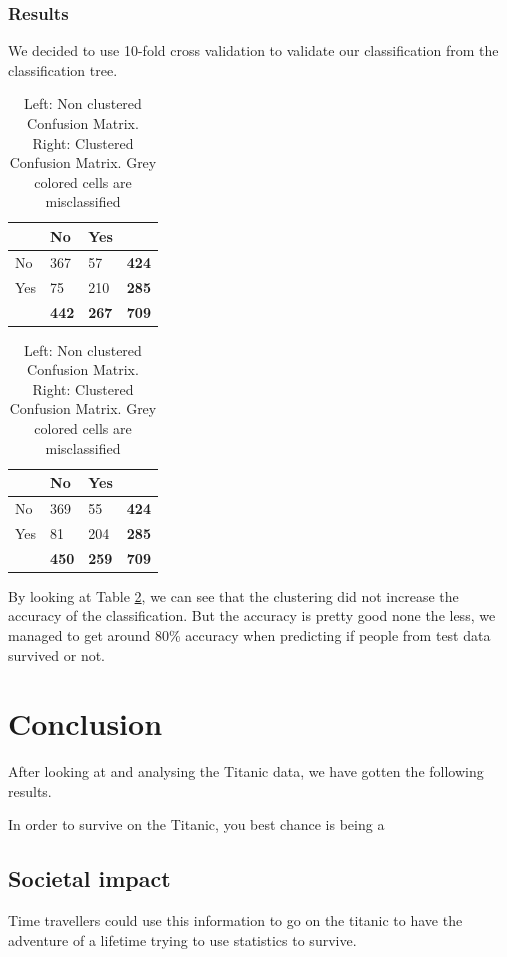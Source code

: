 \documentclass[a4paper,11pt]{article}
\begin{document}
\subsubsection{Results}
We decided to use 10-fold cross validation to validate our classification from the classification tree.

\begin{table}[h]
\begin{center}
\begin{tabular}{|l|l|l|l|}
\hline
& No & Yes &\\
\hline
No & 367 & \cellcolor{gray!30}57 & \textbf{424}\\
Yes &  \cellcolor{gray!30}75 & 210 & \textbf{285}\\
& \textbf{442} & \textbf{267} & \textbf{709}\\
\hline
\end{tabular}
\begin{tabular}{|l|l|l|l|}
\hline
& No & Yes &\\
\hline
No & 369 & \cellcolor{gray!30}55 & \textbf{424}\\
Yes &  \cellcolor{gray!30} 81 & 204 & \textbf{285}\\
& \textbf{450} & \textbf{259} & \textbf{709}\\
\hline
\end{tabular}
\caption{Left: Non clustered Confusion Matrix. Right: Clustered Confusion Matrix. Grey colored cells are misclassified}
\label{confusionMatrix}
\end{center}
\end{table}

By looking at Table \ref{confusionMatrix}, we can see that the clustering did not increase the accuracy of the classification. But the accuracy is pretty good none the less, we managed to get around 80\% accuracy when predicting if people from test data survived or not.

\clearpage
\section{Conclusion}
After looking at and analysing the Titanic data, we have gotten the following results. 

In order to survive on the Titanic, you best chance is being a 
\subsection{Societal impact}
Time travellers could use this information to go on the titanic to have the adventure of a lifetime trying to use statistics to survive.
\end{document}
